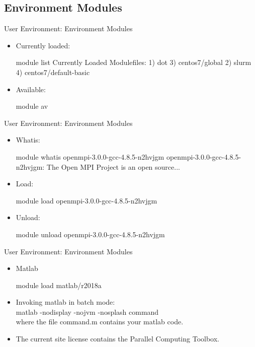 \subsection{Environment Modules}
\begin{frame}[fragile]{User Environment: Environment Modules}
\begin{itemize}
\item{Currently loaded:}
\begin{semiverbatim}
\scriptsize
module list
Currently Loaded Modulefiles:
  1) dot                     3) centos7/global
  2) slurm                   4) centos7/default-basic
\end{semiverbatim}
\medskip
\item{Available:}
\begin{semiverbatim}
\scriptsize
module av
\end{semiverbatim}
\end{itemize}
\end{frame}

\begin{frame}[fragile]{User Environment: Environment Modules}
\begin{itemize}
\item{Whatis:}
\begin{semiverbatim}
\tiny
module whatis openmpi-3.0.0-gcc-4.8.5-n2hvjgm
openmpi-3.0.0-gcc-4.8.5-n2hvjgm: The Open MPI Project is an open source...
\end{semiverbatim}
\medskip
\item{Load:}
\begin{semiverbatim}
\scriptsize
module load openmpi-3.0.0-gcc-4.8.5-n2hvjgm
\end{semiverbatim}
\medskip
\item{Unload:}
\begin{semiverbatim}
\scriptsize
module unload openmpi-3.0.0-gcc-4.8.5-n2hvjgm
\end{semiverbatim}
\end{itemize}
\end{frame}

\begin{frame}[fragile]{User Environment: Environment Modules}
\begin{itemize}
\item{Matlab}
\begin{semiverbatim}
\scriptsize
module load matlab/r2018a
\end{semiverbatim}
\medskip\pause
\item{Invoking matlab in batch mode:\hfill\\
  \qquad \alert{matlab -nodisplay -nojvm -nosplash command}\hfill\\
  where the file \alert{command.m} contains your matlab code.}
  \pause
  \item{The current site license contains the Parallel Computing Toolbox.}
\end{itemize}
\end{frame}

